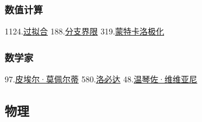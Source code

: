 \subsubsection{数值计算}
1124.\href{https://wuli.wiki/assets/sogou/1124.\%E8\%BF\%87\%E6\%8B\%9F\%E5\%90\%88\%20-\%20\%E6\%90\%9C\%E7\%8B\%97\%E7\%A7\%91\%E5\%AD\%A6\%E7\%99\%BE\%E7\%A7\%91.html}{过拟合}
188.\href{https://wuli.wiki/assets/sogou/188.\%E5\%88\%86\%E6\%94\%AF\%E7\%95\%8C\%E9\%99\%90\%20-\%20\%E6\%90\%9C\%E7\%8B\%97\%E7\%A7\%91\%E5\%AD\%A6\%E7\%99\%BE\%E7\%A7\%91.html}{分支界限}
319.\href{https://wuli.wiki/assets/sogou/319.\%E8\%92\%99\%E7\%89\%B9\%E5\%8D\%A1\%E6\%B4\%9B\%E6\%9E\%81\%E5\%8C\%96\%20-\%20\%E6\%90\%9C\%E7\%8B\%97\%E7\%A7\%91\%E5\%AD\%A6\%E7\%99\%BE\%E7\%A7\%91.html}{蒙特卡洛极化}
\subsubsection{数学家}
97.\href{https://wuli.wiki/assets/sogou/97.\%E7\%9A\%AE\%E5\%9F\%83\%E5\%B0\%94\%C2\%B7\%E8\%8E\%AB\%E4\%BD\%A9\%E5\%B0\%94\%E8\%92\%82\%20-\%20\%E6\%90\%9C\%E7\%8B\%97\%E7\%A7\%91\%E5\%AD\%A6\%E7\%99\%BE\%E7\%A7\%91.html}{皮埃尔·莫佩尔蒂}
580.\href{https://wuli.wiki/assets/sogou/580.\%E6\%B4\%9B\%E5\%BF\%85\%E8\%BE\%BE\%20-\%20\%E6\%90\%9C\%E7\%8B\%97\%E7\%A7\%91\%E5\%AD\%A6\%E7\%99\%BE\%E7\%A7\%91.html}{洛必达}
48.\href{https://wuli.wiki/assets/sogou/48.\%E6\%B8\%A9\%E7\%90\%B4\%E4\%BD\%90\%C2\%B7\%E7\%BB\%B4\%E7\%BB\%B4\%E4\%BA\%9A\%E5\%B0\%BC\%20-\%20\%E6\%90\%9C\%E7\%8B\%97\%E7\%A7\%91\%E5\%AD\%A6\%E7\%99\%BE\%E7\%A7\%91.html}{温琴佐·维维亚尼}
\subsection{物理}

